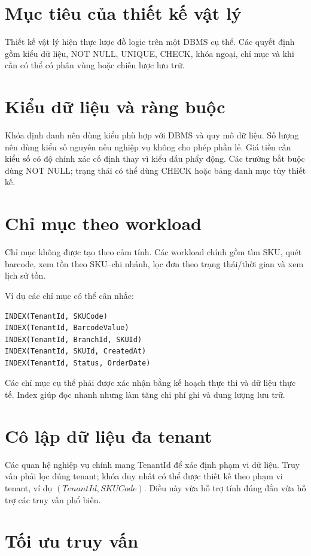 \section{Mục tiêu của thiết kế vật lý}

Thiết kế vật lý hiện thực lược đồ logic trên một DBMS cụ thể. Các quyết định gồm kiểu dữ liệu, NOT NULL, UNIQUE, CHECK, khóa ngoại, chỉ mục và khi cần có thể có phân vùng hoặc chiến lược lưu trữ.

\section{Kiểu dữ liệu và ràng buộc}

Khóa định danh nên dùng kiểu phù hợp với DBMS và quy mô dữ liệu. Số lượng nên dùng kiểu số nguyên nếu nghiệp vụ không cho phép phần lẻ. Giá tiền cần kiểu số có độ chính xác cố định thay vì kiểu dấu phẩy động. Các trường bắt buộc dùng NOT NULL; trạng thái có thể dùng CHECK hoặc bảng danh mục tùy thiết kế.

\section{Chỉ mục theo workload}

Chỉ mục không được tạo theo cảm tính. Các workload chính gồm tìm SKU, quét barcode, xem tồn theo SKU--chi nhánh, lọc đơn theo trạng thái/thời gian và xem lịch sử tồn.

Ví dụ các chỉ mục có thể cân nhắc:
\begin{verbatim}
INDEX(TenantId, SKUCode)
INDEX(TenantId, BarcodeValue)
INDEX(TenantId, BranchId, SKUId)
INDEX(TenantId, SKUId, CreatedAt)
INDEX(TenantId, Status, OrderDate)
\end{verbatim}

Các chỉ mục cụ thể phải được xác nhận bằng kế hoạch thực thi và dữ liệu thực tế. Index giúp đọc nhanh nhưng làm tăng chi phí ghi và dung lượng lưu trữ.

\section{Cô lập dữ liệu đa tenant}

Các quan hệ nghiệp vụ chính mang TenantId để xác định phạm vi dữ liệu. Truy vấn phải lọc đúng tenant; khóa duy nhất có thể được thiết kế theo phạm vi tenant, ví dụ $(TenantId, SKUCode)$. Điều này vừa hỗ trợ tính đúng đắn vừa hỗ trợ các truy vấn phổ biến.

\section{Tối ưu truy vấn}

